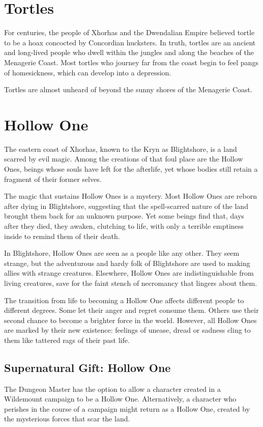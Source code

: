 \documentclass[10pt,a4paper,twoside,bg=print,twocolumn,openany,nodeprecatedcode]{dndbook}
\begin{document}
\section{Tortles}
For centuries, the people of Xhorhas and the Dwendalian Empire believed tortle to be a hoax concocted by Concordian hucksters. In truth, tortles are an ancient and long-lived people who dwell within the jungles and along the beaches of the Menagerie Coast. Most tortles who journey far from the coast begin to feel pangs of homesickness, which can develop into a depression.

Tortles are almost unheard of beyond the sunny shores of the Menagerie Coast.

\section{Hollow One}
The eastern coast of Xhorhas, known to the Kryn as Blightshore, is a land scarred by evil magic. Among the creations of that foul place are the Hollow Ones, beings whose souls have left for the afterlife, yet whose bodies still retain a fragment of their former selves.

The magic that sustains Hollow Ones is a mystery. Most Hollow Ones are reborn after dying in Blightshore, suggesting that the spell-scarred nature of the land brought them back for an unknown purpose. Yet some beings find that, days after they died, they awaken, clutching to life, with only a terrible emptiness inside to remind them of their death.

In Blightshore, Hollow Ones are seen as a people like any other. They seem strange, but the adventurous and hardy folk of Blightshore are used to making allies with strange creatures. Elsewhere, Hollow Ones are indistinguishable from living creatures, save for the faint stench of necromancy that lingers about them.

The transition from life to becoming a Hollow One affects different people to different degrees. Some let their anger and regret consume them. Others use their second chance to become a brighter force in the world. However, all Hollow Ones are marked by their new existence: feelings of unease, dread or sadness cling to them like tattered rags of their past life.

\subsection{Supernatural Gift: Hollow One}
The Dungeon Master has the option to allow a character created in a Wildemount campaign to be a Hollow One. Alternatively, a character who perishes in the course of a campaign might return as a Hollow One, created by the mysterious forces that scar the land.
\end{document}
